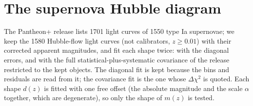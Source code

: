 \documentclass[11pt]{article}
\begin{document}
\section{The supernova Hubble diagram}\label{sec:sn}

The Pantheon+ release \cite{scolnic2022,brout2022} lists 1701 light
curves of 1550 type Ia supernovae; we keep the 1580 Hubble-flow light
curves (not calibrators, $z \ge 0.01$) with their corrected apparent
magnitudes, and fit each shape
twice: with the diagonal errors, and with the full
statistical-plus-systematic covariance of the release restricted to the
kept objects. The diagonal fit is kept because the bins and residuals are
read from it; the covariance fit is the one whose $\Delta\chi^2$ is
quoted. Each shape $d(z)$ is fitted with one free offset (the absolute
magnitude and the scale $\alpha$ together, which are degenerate), so only
the shape of $m(z)$ is tested.
\end{document}
